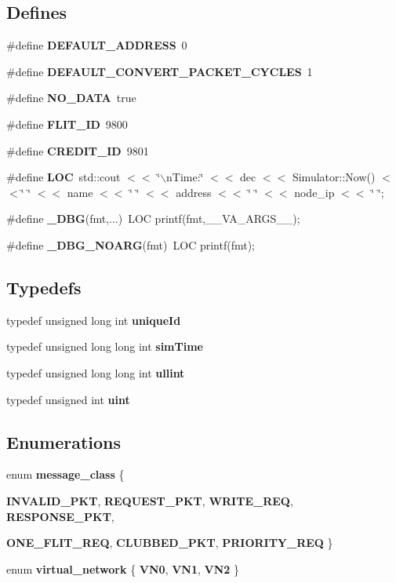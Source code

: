 \subsection*{Defines}
\begin{CompactItemize}
\item 
\#define {\bf DEFAULT\_\-ADDRESS}~0
\item 
\#define {\bf DEFAULT\_\-CONVERT\_\-PACKET\_\-CYCLES}~1
\item 
\#define {\bf NO\_\-DATA}~true
\item 
\#define {\bf FLIT\_\-ID}~9800
\item 
\#define {\bf CREDIT\_\-ID}~9801
\item 
\#define {\bf LOC}~std::cout $<$$<$ \char`\"{}$\backslash$nTime:\char`\"{} $<$$<$ dec $<$$<$ Simulator::Now() $<$$<$\char`\"{} \char`\"{} $<$$<$ name $<$$<$ \char`\"{} \char`\"{} $<$$<$ address $<$$<$ \char`\"{} \char`\"{} $<$$<$ node\_\-ip $<$$<$ \char`\"{} \char`\"{};
\item 
\#define {\bf \_\-DBG}(fmt,...)~LOC printf(fmt,\_\-\_\-VA\_\-ARGS\_\-\_\-);
\item 
\#define {\bf \_\-DBG\_\-NOARG}(fmt)~LOC printf(fmt);
\end{CompactItemize}
\subsection*{Typedefs}
\begin{CompactItemize}
\item 
typedef unsigned long int {\bf uniqueId}
\item 
typedef unsigned long long int {\bf simTime}
\item 
typedef unsigned long long int {\bf ullint}
\item 
typedef unsigned int {\bf uint}
\end{CompactItemize}
\subsection*{Enumerations}
\begin{CompactItemize}
\item 
enum {\bf message\_\-class} \{ \par
{\bf INVALID\_\-PKT}, 
{\bf REQUEST\_\-PKT}, 
{\bf WRITE\_\-REQ}, 
{\bf RESPONSE\_\-PKT}, 
\par
{\bf ONE\_\-FLIT\_\-REQ}, 
{\bf CLUBBED\_\-PKT}, 
{\bf PRIORITY\_\-REQ}
 \}
\item 
enum {\bf virtual\_\-network} \{ {\bf VN0}, 
{\bf VN1}, 
{\bf VN2}
 \}
\end{CompactItemize}
